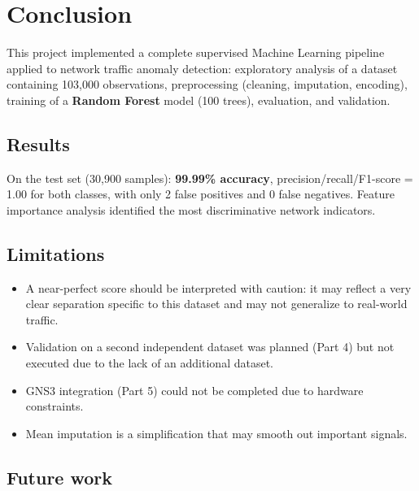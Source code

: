 \chapter*{Conclusion}

This project implemented a complete supervised Machine Learning pipeline applied to network traffic anomaly detection: exploratory analysis of a dataset containing 103,000 observations, preprocessing (cleaning, imputation, encoding), training of a \textbf{Random Forest} model (100 trees), evaluation, and validation.

\section*{Results}

On the test set (30,900 samples): \textbf{99.99\% accuracy}, precision/recall/F1-score = 1.00 for both classes, with only 2 false positives and 0 false negatives. Feature importance analysis identified the most discriminative network indicators.

\section*{Limitations}

\begin{itemize}[leftmargin=*,itemsep=2pt]
    \item A near-perfect score should be interpreted with caution: it may reflect a very clear separation specific to this dataset and may not generalize to real-world traffic.
    \item Validation on a second independent dataset was planned (Part 4) but not executed due to the lack of an additional dataset.
    \item GNS3 integration (Part 5) could not be completed due to hardware constraints.
    \item Mean imputation is a simplification that may smooth out important signals.
\end{itemize}

\section*{Future work}

